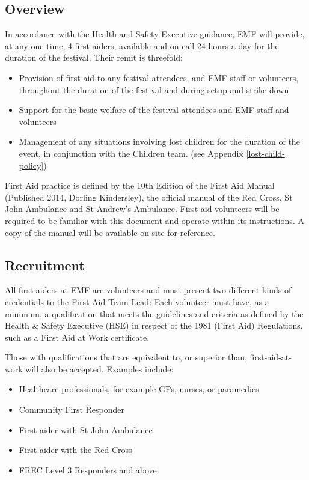 \subsection{Overview}
In accordance with the Health and Safety Executive guidance, EMF will
provide, at any one time, 4 first-aiders, available and on call 24 hours a day
for the duration of the festival. Their remit is threefold:

\begin{itemize}
  \item Provision of first aid to any festival attendees, and EMF staff or
  volunteers, throughout the duration of the festival and during setup and
  strike-down
  \item Support for the basic welfare of the festival attendees and EMF
  staff and volunteers
  \item Management of any situations involving lost children for the duration of
  the event, in conjunction with the Children team. (see Appendix \ref{lost-child-policy})
\end{itemize}

First Aid practice is defined by the 10th Edition of the First Aid Manual
(Published 2014, Dorling Kindersley), the official manual of the Red Cross, St
John Ambulance and St Andrew’s Ambulance. First-aid volunteers will be
required to be familiar with this document and operate within its instructions.
A copy of the manual will be available on site for reference.


\subsection{Recruitment}
All first-aiders at EMF are volunteers and must present two different kinds of
credentials to the First Aid Team Lead: Each volunteer must have, as a minimum,
a qualification that meets the guidelines and criteria as defined by the Health
\& Safety Executive (HSE) in respect of the 1981 (First Aid) Regulations, such
as a First Aid at Work certificate.

Those with qualifications that are equivalent to, or superior than,
first-aid-at-work will also be accepted. Examples include:

\begin{itemize}
  \item Healthcare professionals, for example GPs, nurses, or paramedics
  \item Community First Responder
  \item First aider with St John Ambulance
  \item First aider with the Red Cross
  \item FREC Level 3 Responders and above
\end{itemize}

